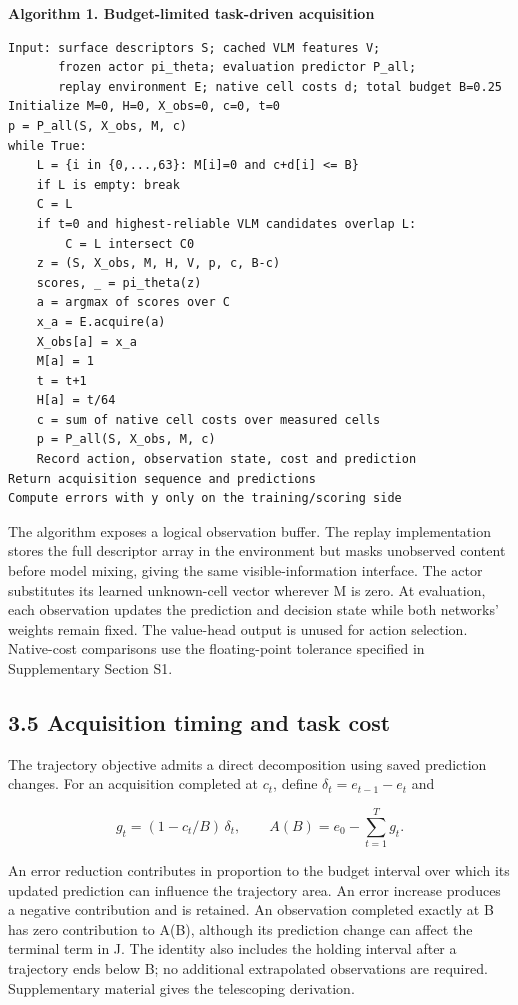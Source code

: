 \begin{minipage}{\linewidth}

\textbf{Algorithm 1. Budget-limited task-driven acquisition}

\begin{verbatim}
Input: surface descriptors S; cached VLM features V;
       frozen actor pi_theta; evaluation predictor P_all;
       replay environment E; native cell costs d; total budget B=0.25
Initialize M=0, H=0, X_obs=0, c=0, t=0
p = P_all(S, X_obs, M, c)
while True:
    L = {i in {0,...,63}: M[i]=0 and c+d[i] <= B}
    if L is empty: break
    C = L
    if t=0 and highest-reliable VLM candidates overlap L:
        C = L intersect C0
    z = (S, X_obs, M, H, V, p, c, B-c)
    scores, _ = pi_theta(z)
    a = argmax of scores over C
    x_a = E.acquire(a)
    X_obs[a] = x_a
    M[a] = 1
    t = t+1
    H[a] = t/64
    c = sum of native cell costs over measured cells
    p = P_all(S, X_obs, M, c)
    Record action, observation state, cost and prediction
Return acquisition sequence and predictions
Compute errors with y only on the training/scoring side
\end{verbatim}

\end{minipage}

The algorithm exposes a logical observation buffer. The replay implementation stores the full descriptor array in the environment but masks unobserved content before model mixing, giving the same visible-information interface. The actor substitutes its learned unknown-cell vector wherever M is zero. At evaluation, each observation updates the prediction and decision state while both networks' weights remain fixed. The value-head output is unused for action selection. Native-cost comparisons use the floating-point tolerance specified in Supplementary Section S1.

\hypertarget{acquisition-timing-and-task-cost}{%
\subsection{3.5 Acquisition timing and task cost}\label{acquisition-timing-and-task-cost}}

The trajectory objective admits a direct decomposition using saved prediction changes. For an acquisition completed at \(c_t\), define \(\delta_t=e_{t-1}-e_t\) and

\[g_t=(1-c_t/B)\,\delta_t,\qquad A(B)=e_0-\sum_{t=1}^{T}g_t.\]

An error reduction contributes in proportion to the budget interval over which its updated prediction can influence the trajectory area. An error increase produces a negative contribution and is retained. An observation completed exactly at B has zero contribution to A(B), although its prediction change can affect the terminal term in J. The identity also includes the holding interval after a trajectory ends below B; no additional extrapolated observations are required. Supplementary material gives the telescoping derivation.

